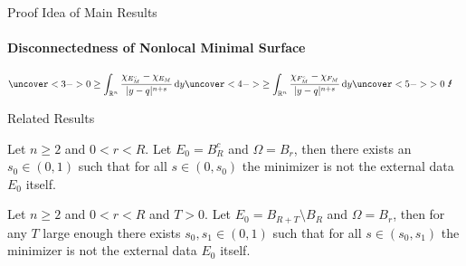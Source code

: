 \documentclass[9pt]{beamer}
\begin{document}
\begin{frame}{Proof Idea of Main Results}
  \framesubtitle{Disconnectedness of Nonlocal Minimal Surface}

  \begin{align*}
    \uncover<3->{0 \geq \int_{\mathbb{R}^n} \frac{\chi_{E_M^c} - \chi_{E_M}}{\lvert y - q \rvert^{n + s}} \dd{y}}
      \uncover<4->{\geq \int_{\mathbb{R}^n} \frac{\chi_{F_M^c} - \chi_{F_M}}{\lvert y - q \rvert^{n + s}} \dd{y}}
      \uncover<5->{ > 0 \textup{ \Lightning}}
      &&
  \end{align*}

    

\end{frame}

\begin{frame}{Related Results}
  \begin{theorem}
  \label{thm:005}
    Let \( n \geq 2 \) and \( 0 < r < R \). Let \( E_0 = B_R^c \) and \( \Omega = B_r \), then there
	  exists an \( s_0 \in (0, 1) \) such that for all \( s \in (0, s_0) \) the minimizer is not the
  	external data \( E_0 \) itself.
  \end{theorem}
  \begin{theorem}
  \label{thm:006}
    Let \( n \geq 2 \) and \( 0 < r < R \) and \( T > 0 \). Let \( E_0 = B_{R + T} \setminus B_R \)
	  and \( \Omega = B_r \), then for any \( T \) large enough there exists \( s_0, s_1 \in (0, 1) \)
	  such that for all \( s \in (s_0, s_1) \) the minimizer is not the external data \( E_0 \) itself.
  \end{theorem}
\end{frame}
\end{document}
